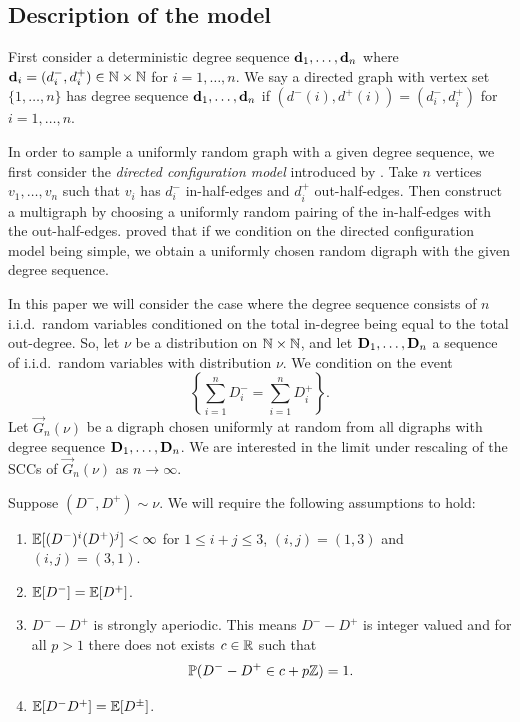 \subsection{Description of the model}

First consider a deterministic degree sequence ${\mathbf d}_1, \ldots, {\mathbf d}_n$ where ${\mathbf d}_i = (d_i^-, d_i^+)\in {\mathbb N} \times {\mathbb N}$ for $i = 1, \ldots, n$. We say a directed graph with vertex set $\{1,\dots,n\}$ has degree sequence ${\mathbf d}_1, \ldots, {\mathbf d}_n$ if $(d^-(i), d^+(i)) = (d_i^-, d_i^+)$ for $i = 1, \ldots, n$.

In order to sample a uniformly random graph with a given degree sequence, we first consider the \emph{directed configuration model} introduced by \citet{cooperSizeLargestStrongly2004}. Take $n$ vertices $v_1, \ldots, v_n$ such that $v_i$ has $d^-_i$ in-half-edges and $d^+_i$ out-half-edges. Then construct a multigraph by choosing a uniformly random pairing of the in-half-edges with the out-half-edges. \citet{cooperSizeLargestStrongly2004} proved that if we condition on the directed configuration model being simple, we obtain a uniformly chosen random digraph with the given degree sequence.

In this paper we will consider the case where the degree sequence  consists of $n$ i.i.d.\ random variables conditioned on the total in-degree being equal to the total out-degree. So, let $\nu$ be a distribution on ${\mathbb N} \times {\mathbb N}$, and let ${\mathbf D}_1, \ldots, {\mathbf D}_n$ a sequence of i.i.d.\ random variables with distribution $\nu$. We condition on the event
\begin{equation*}
    \left\{ \textstyle \sum_{i=1}^n D_i^- = \sum_{i=1}^n D_i^+ \right\}.
\end{equation*}
Let $\vec{G}_n(\nu)$ be a digraph chosen uniformly at random from all digraphs with degree sequence ${\mathbf D}_1, \ldots, {\mathbf D}_n$. We are interested in the limit under rescaling of the SCCs of $\vec{G}_n(\nu)$ as $n\to \infty$.

Suppose $(D^-, D^+) \sim \nu$. We will require the following assumptions to hold:
\begin{enumerate}
    \item ${\mathbb E}[(D^-)^i(D^+)^j]< \infty$ for $1 \leq i+j\leq 3$, $(i, j) = (1, 3)$ and $(i, j) = (3, 1)$.
    \item ${\mathbb E}[D^-] = {\mathbb E}[D^+]$.
    \item $D^- - D^+$ is strongly aperiodic. This means $D^- - D^+$ is integer valued and for all $p > 1$ there does not exists $c \in {\mathbb R}$ such that 
    \begin{equation*}
        {\mathbb P}(D^- - D^+ \in c + p{\mathbb Z}) = 1.
    \end{equation*}
    \item ${\mathbb E}[D^-D^+] = {\mathbb E}[D^{\pm}]$.
\end{enumerate}


